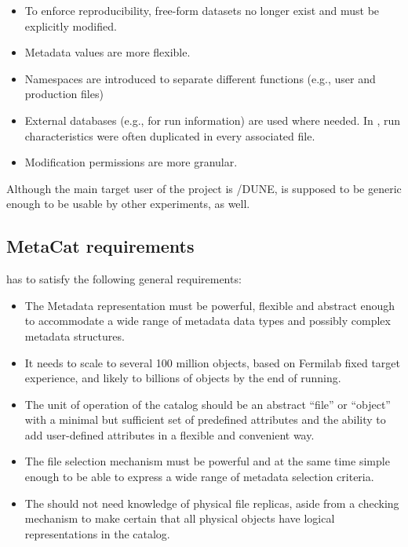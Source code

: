 \documentclass[../main-v1.tex]{subfiles}
\begin{document}
\begin{itemize}  
\item To enforce reproducibility, %
free-form datasets no longer exist and  must be explicitly modified.
\item Metadata values are more flexible.
\item Namespaces are introduced to separate different functions (e.g., user %
and production files)
\item External databases (e.g., for run information) are used where needed.  In , run characteristics were often duplicated in every associated file.
\item Modification permissions are more granular.
\end{itemize} 

Although the main target user of the project is /DUNE,  is supposed to be generic enough to be usable by %
other experiments, as well.   


\subsection{MetaCat requirements}
 has to satisfy the following general requirements: 

\begin{itemize} 
\item 
The Metadata representation must be powerful, flexible and abstract enough to accommodate a wide range of metadata data types and possibly complex metadata structures. 

\item
It needs to scale to several 100 million objects, based on Fermilab fixed target experience, and likely to billions of objects by the end of  running. %

\item
The unit of operation of the catalog should be an abstract ``file'' or ``object'' with a  minimal but sufficient set of predefined   attributes and the ability to add user-defined   attributes in a flexible and convenient way. 

\item 
The file selection mechanism must be powerful and at the same time simple enough to be able to express a wide range of metadata selection criteria. 

\item 
The  should not need knowledge of physical file replicas, aside from a checking mechanism to make certain that all physical objects have logical representations in the catalog. 

\end{itemize} 
 
\end{document}
